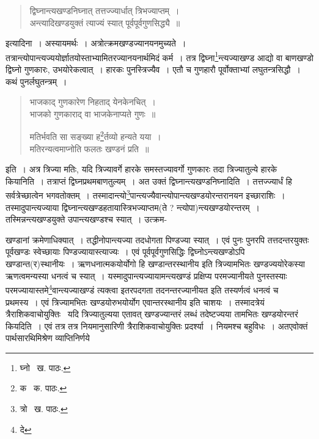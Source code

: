 \documentclass[11pt, openany]{book}
\begin{document}
\begin{quote}
{\qt द्विघ्नान्त्यखण्डनिघ्नात् तत्तज्ज्यार्धात् त्रिभज्याप्तम्~।\\
अन्त्यादिखण्डयुक्तं त्याज्यं स्यात् पूर्वपूर्वगुणसिद्ध्यै~॥}
\end{quote}

\noindent इत्यादिना~। अस्यायमर्थः~। अत्रोत्क्रमखण्डज्यानयनमुच्यते~। तत्रान्त्योपान्त्यज्ययोर्ज्ञातयोस्ताभ्यामितरज्यानयनार्थमिदं कर्म~। तत्र
द्विघ्ना\renewcommand{\thefootnote}{१}\footnote{घ्नो \textendash\ ख. पाठः.}न्त्यज्याखण्ड आद्यो वा बाणखण्डो द्विघ्नो गुणकारः, उभयोरेकत्वात्~। हारकः पुनस्त्रिज्यैव~। एतौ च गुणहारौ पूर्वोक्ताभ्यां लघुतन्त्रसिद्धौ~। कथं पुनर्लघुतन्त्रम्~। 

\begin{quote}
{\qt भाजकाद् गुणकारेण निहताद् येनकेनचित्~।\\
भाजको गुणकाराद् वा भाजकेनाप्यते गुणः~॥

मतिर्भवति सा सङ्ख्या ह\renewcommand{\thefootnote}{२}\footnote{क \textendash\ क. पाठः.}र्तव्यो हन्यते यया~।\\
मतिरन्यत्वमाप्नोति फलतः खण्डनं प्रति~॥}
\end{quote}

\noindent इति~। अत्र त्रिज्या मतिः, यदि त्रिज्यावर्गे हारके समस्तज्यावर्गो गुणकारः तदा त्रिज्यातुल्ये हारके कियानिति~। तत्राप्तं द्विघ्नप्रथमबाणतुल्यम्~। अत उक्तं {\qt द्विघ्नान्त्यखण्डनिघ्नादि}ति~। तत्तज्ज्यार्धं हि सर्वत्रेच्छात्वेन भगवतोक्तम्~। तस्मादान्त्यो\renewcommand{\thefootnote}{३}\footnote{त्रो \textendash\ ख. पाठः.}पान्त्यज्यैवान्त्योपान्त्यखण्डयोरन्तरानयन इच्छाराशिः~। तस्मादुपान्त्यज्याया द्विघ्नान्त्यखण्डहतायास्त्रिभज्याप्तम(ते ?
न्त्योपा)न्त्यखण्डयोरन्तरम्~। तस्मिन्नन्त्यखण्डयुक्ते उपान्त्यखण्डश्च स्यात्~। उत्क्रम-

\newpage

\noindent खण्डानां क्रमेणाधिक्यात्~। तद्धीनोपान्त्यज्या तदधोगता पिण्डज्या स्यात्~। एवं पुनः पुनरपि तत्तदन्तरयुक्तः पूर्वखण्डः स्वेच्छायाः
पिण्डज्यायास्त्याज्यः~। एवं पूर्वपूर्वगुणसिद्धिः द्विघ्नोऽन्त्यखण्डोऽपि खण्डान्त(र)स्थानीयः~। ऋणधनात्मकयोर्योगो हि खण्डान्तरस्थानीय इति त्रिज्यामभितः खण्डज्ययोरेकस्या ऋणत्वमन्यस्या धनत्वं च स्यात्~। यस्मादुपान्त्यज्यायामन्त्यखण्डं प्रक्षिप्य परमज्यानीयते पुनस्तस्याः परमज्यायास्तमे\renewcommand{\thefootnote}{१}\footnote{दे}वान्त्यज्याखण्डं त्यक्त्वा इतरपदगता तदनन्तरज्यानीयत इति तस्यर्णत्वं धनत्वं च प्रथमस्य~। एवं त्रिज्यामभितः खण्डयोरुभयोर्योग एवान्तरस्थानीय इति चाशयः~। तस्मादत्रेयं त्रैराशिकवाचोयुक्तिः \textendash\ यदि त्रिज्यातुल्यया एतावत् खण्डज्यान्तरं लब्धं तदेष्टज्यया तामभितः खण्डयोरन्तरं कियदिति~। एवं तत्र तत्र नियमानुसारिणी त्रैराशिकवाचोयुक्तिः प्रदर्श्या~। नियमश्च बहुविधः~। अतएवोक्तं पार्थसारथिमिश्रेण व्याप्तिनिर्णये\textendash
\end{document}
